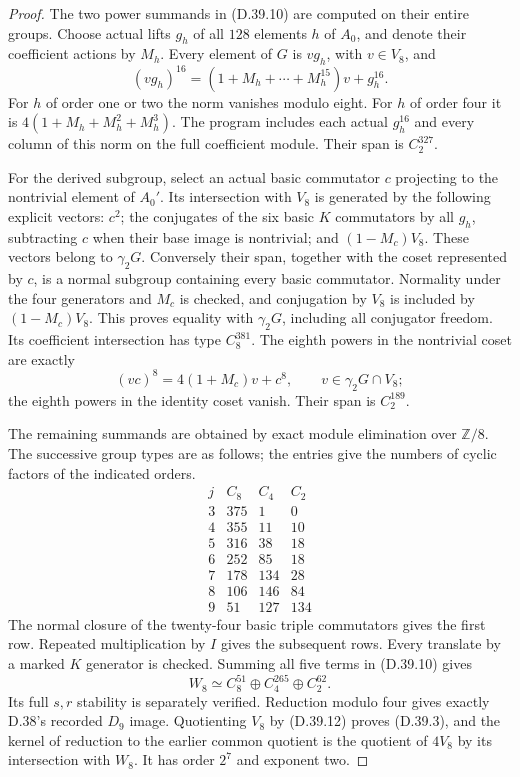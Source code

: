 \begin{proof}
The two power summands in (D.39.10) are computed on their
entire groups. Choose actual lifts $g_h$ of all $128$
elements $h$ of $A_0$, and denote their coefficient actions
by $M_h$. Every element of $G$ is $v g_h$, with $v\in V_8$,
and
\[
 (v g_h)^{16}=(1+M_h+\cdots+M_h^{15})v+g_h^{16}.
\]
For $h$ of order one or two the norm vanishes modulo eight.
For $h$ of order four it is
$4(1+M_h+M_h^2+M_h^3)$. The program includes each actual
$g_h^{16}$ and every column of this norm on the full
coefficient module. Their span is $C_2^{327}$.

For the derived subgroup, select an actual basic commutator
$c$ projecting to the nontrivial element of $A_0'$. Its
intersection with $V_8$ is generated by the following
explicit vectors: $c^2$; the conjugates of the six basic
$K$ commutators by all $g_h$, subtracting $c$ when their
base image is nontrivial; and $(1-M_c)V_8$. These vectors
belong to $\gamma_2G$. Conversely their span, together
with the coset represented by $c$, is a normal subgroup
containing every basic commutator. Normality under the
four generators and $M_c$ is checked, and conjugation
by $V_8$ is included by $(1-M_c)V_8$. This proves equality
with $\gamma_2G$, including all conjugator freedom. Its
coefficient intersection has type $C_8^{381}$. The eighth
powers in the nontrivial coset are exactly
\[
 (v c)^8=4(1+M_c)v+c^8,
 \qquad v\in\gamma_2G\cap V_8;
\]
the eighth powers in the identity coset vanish. Their span
is $C_2^{189}$.

The remaining summands are obtained by exact module
elimination over $\mathbb Z/8$. The successive group types
are as follows; the entries give the numbers of cyclic
factors of the indicated orders.
\[
 \begin{array}{c|rrr}
 j& C_8&C_4&C_2\\\hline
 3&375&1&0\\
 4&355&11&10\\
 5&316&38&18\\
 6&252&85&18\\
 7&178&134&28\\
 8&106&146&84\\
 9&51&127&134
 \end{array}                                                   \tag{D.39.11}
\]
The normal closure of the twenty-four basic triple
commutators gives the first row. Repeated multiplication
by $I$ gives the subsequent rows. Every translate by a
marked $K$ generator is checked. Summing all five terms
in (D.39.10) gives
\[
 W_8\simeq C_8^{51}\oplus C_4^{265}\oplus C_2^{62}.         \tag{D.39.12}
\]
Its full $s,r$ stability is separately verified. Reduction
modulo four gives exactly D.38's recorded $D_9$ image.
Quotienting $V_8$ by (D.39.12) proves (D.39.3), and the
kernel of reduction to the earlier common quotient is
the quotient of $4V_8$ by its intersection with $W_8$.
It has order $2^7$ and exponent two.


\end{proof}
